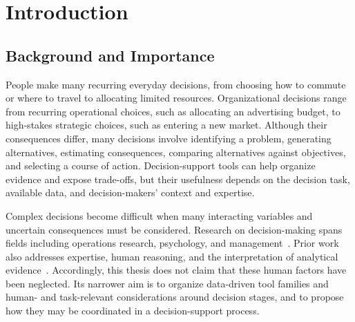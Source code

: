 \documentclass{sfuthesis}
\begin{document}
%
%

\mainmatter

\chapter{Introduction}
\section{Background and Importance}
People make many recurring everyday decisions, from choosing how to commute or where to travel to allocating limited resources. Organizational decisions range from recurring operational choices, such as allocating an advertising budget, to high-stakes strategic choices, such as entering a new market. Although their consequences differ, many decisions involve identifying a problem, generating alternatives, estimating consequences, comparing alternatives against objectives, and selecting a course of action. Decision-support tools can help organize evidence and expose trade-offs, but their usefulness depends on the decision task, available data, and decision-makers' context and expertise.

Complex decisions become difficult when many interacting variables and uncertain consequences must be considered. Research on decision-making spans fields including operations research, psychology, and management~\cite{adinolfi2021journey}. Prior work also addresses expertise, human reasoning, and the interpretation of analytical evidence~\cite{zaimoglu2023epistemological,pratt_bringing_2023}. Accordingly, this thesis does not claim that these human factors have been neglected. Its narrower aim is to organize data-driven tool families and human- and task-relevant considerations around decision stages, and to propose how they may be coordinated in a decision-support process.
\end{document}
